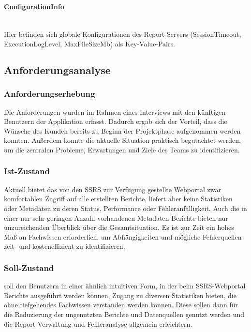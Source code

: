 \paragraph{ConfigurationInfo} ~\\
\label{p:ConfigurationInfo}
Hier befinden sich globale Konfigurationen des Report-Servers (SessionTimeout, Execution\-Log\-Level, MaxFileSizeMb) als Key-Value-Pairs.


\subsection{Anforderungsanalyse}
\label{sec:Anforderungsanalyse}

\subsubsection{Anforderungserhebung}
\label{sec:Anforderungserhebung}
Die Anforderungen wurden im Rahmen eines Interviews mit den künftigen Benutzern der Applikation erfasst. Dadurch ergab sich der Vorteil, dass die Wünsche des Kunden bereits zu Beginn der Projektphase aufgenommen werden konnten. Außerdem konnte die aktuelle Situation praktisch begutachtet werden, um die zentralen Probleme, Erwartungen und Ziele des Teams \teamName zu identifizieren.

\subsubsection{Ist-Zustand}
\label{sec:Ist}
Aktuell bietet das von den \ac{SSRS} zur Verfügung gestellte Webportal zwar komfortablen Zugriff auf alle erstellten Berichte, liefert aber keine Statistiken oder Metadaten zu deren Status, Performance oder Fehleranfälligkeit. Auch die in einer nur sehr geringen Anzahl vorhandenen Metadaten-Berichte bieten nur unzureichenden Überblick über die Gesamtsituation. Es ist zur Zeit ein hohes Maß an Fachwissen erforderlich, um Abhängigkeiten und mögliche Fehlerquellen zeit- und kosteneffizient zu identifizieren.

\subsubsection{Soll-Zustand}
\label{sec:Soll}
\projektName soll den Benutzern in einer ähnlich intuitiven Form, in der beim \ac{SSRS}-Webportal Berichte ausgeführt werden können, Zugang zu diversen Statistiken bieten, die ohne tiefgehendes Fachwissen verstanden werden können. Diese sollen dann für die Reduzierung der ungenutzten Berichte und Datenquellen genutzt werden und die Report-Verwaltung und Fehleranalyse allgemein erleichtern.

